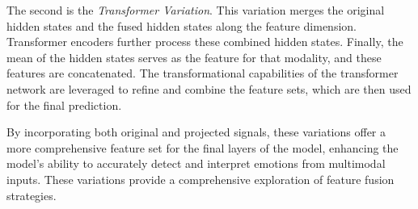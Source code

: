 \documentclass[11pt]{article}
\begin{document}
The second is the {\it Transformer Variation}. This variation merges the original hidden states and the fused hidden states along the feature dimension. 
Transformer encoders further process these combined hidden states. Finally, the mean of the hidden states serves as the feature for that modality, and these features are concatenated. The transformational capabilities of the transformer network are leveraged to refine and combine the feature sets, which are then used for the final prediction.

By incorporating both original and projected signals, these variations offer a more comprehensive feature set for the final layers of the model, enhancing the model's ability to accurately detect and interpret emotions from multimodal inputs. These variations provide a comprehensive exploration of feature fusion strategies.
\end{document}
